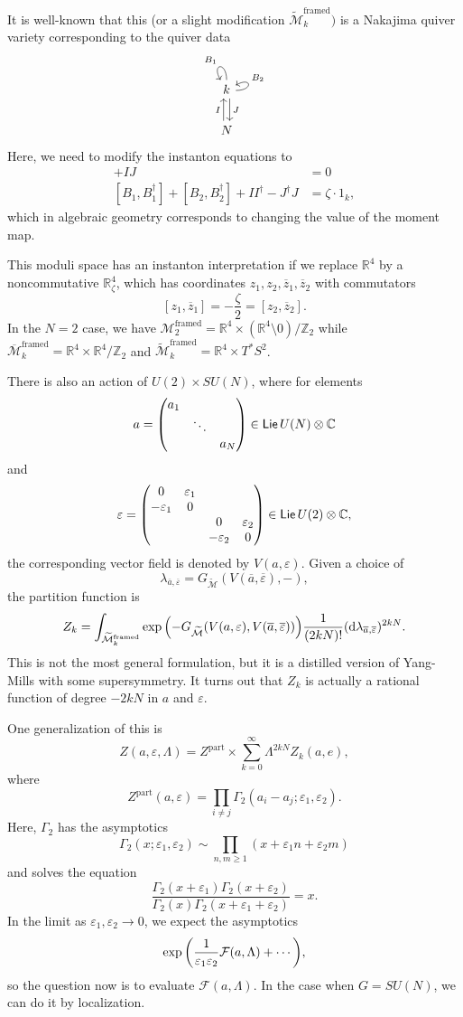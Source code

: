 \documentclass[leqno, openany]{memoir}
\theoremstyle{definition}
\theoremstyle{remark}
\theoremstyle{plain}
\theoremstyle{definition}
\theoremstyle{remark}
\newcommand{\R}{\mathbb{R}}
\newcommand{\C}{\mathbb{C}}
\newcommand{\Z}{\mathbb{Z}}
\newcommand{\ep}{\varepsilon}
\newcommand{\mc}[1]{\mathcal{#1}}
\newcommand{\mr}[1]{\mathrm{#1}}
\newcommand{\ms}[1]{\mathsf{#1}}
\newcommand{\on}[1]{\operatorname{#1}}
\newcommand{\ol}[1]{\overline{#1}}
\newcommand{\wt}[1]{\widetilde{#1}}
\begin{document}
It is well-known that this (or a slight modification $\wt{\mc{M}}_k^{\mr{framed}})$ is a Nakajima quiver variety corresponding to the quiver data
\begin{equation*}
\begin{tikzcd}
    k \ar[shift left=1]{d}{J} \arrow[out=0,in=30,loop,swap,"B_2"] \arrow[out=90,in=120,loop,swap,"B_1"]\\
    N \ar[shift left=1]{u}{I}
\end{tikzcd}
\end{equation*}
Here, we need to modify the instanton equations to
\begin{align*}
    [B_1, B_2] + IJ &= 0 \\
    [B_1, B_1^{\dag}] + [B_2, B_2^{\dag}] + I I^{\dag} - J^{\dag} J &= \zeta \cdot 1_k,
\end{align*}
which in algebraic geometry corresponds to changing the value of the moment map.

This moduli space has an instanton interpretation if we replace $\R^4$ by a noncommutative $\R^4_{\zeta}$, which has coordinates $z_1, z_2, \ol{z}_1, \ol{z}_2$ with commutators
\[ [z_1, \ol{z}_1] = -\frac{\zeta}{2} = [z_2, \ol{z}_2]. \]
In the $N=2$ case, we have $\mc{M}_2^{\mr{framed}} = \R^4 \times (\R^4 \setminus 0)/\Z_2$ while $\ol{\mc{M}}_k^{\mr{framed}} = \R^4 \times \R^4/\Z_2$ and $\wt{\mc{M}}_k^{\mr{framed}} = \R^4 \times T^* S^2$.

There is also an action of $U(2) \times SU(N)$, where for elements
\[ a = \mqty(\dmat{a_1,\ddots,a_N}) \in \on{\ms{Lie}} U(N) \otimes \C \]
and
\[\ep = \mqty(0 & \ep_1 \\ -\ep_1 & 0 \\ & & 0 & \ep_2 \\ & & -\ep_2 & 0) \in \on{\ms{Lie}} U(2) \otimes \C, \]
the corresponding vector field is denoted by $V(a,\ep)$. Given a choice of
\[ \lambda_{\ol{a}, \ol{\ep}} = G_{\wt{\mc{M}}}(V(\ol{a}, \ol{\ep}), -), \]
the partition function is
\[ Z_k = \int_{\wt{\mc{M}}_k^{\mr{framed}}} \exp \qty(-G_{\wt{\mc{M}}}(V(a,\ep), V(\ol{a}, \ol{\ep}))) \frac{1}{(2kN)!} (\dd \lambda_{\ol{a}, \ol{\ep}})^{2kN}. \]
This is not the most general formulation, but it is a distilled version of Yang-Mills with some supersymmetry. It turns out that $Z_k$ is actually a rational function of degree $-2kN$ in $a$ and $\ep$.

One generalization of this is
\[ Z(a,\ep,\Lambda) = Z^{\mr{part}} \times \sum_{k=0}^{\infty} \Lambda^{2kN} Z_k(a,e), \]
where
\[ Z^{\mr{part}}(a,\ep) = \prod_{i \neq j} \Gamma_2(a_i-a_j; \ep_1, \ep_2). \]
Here, $\Gamma_2$ has the asymptotics
\[ \Gamma_2(x; \ep_1, \ep_2) \sim \prod_{n,m \geq 1}(x+\ep_1 n + \ep_2 m) \]
and solves the equation
\[ \frac{\Gamma_2(x+\ep_1) \Gamma_2(x+\ep_2)}{\Gamma_2(x) \Gamma_2(x+\ep_1+\ep_2)} = x. \]
In the limit as $\ep_1, \ep_2 \to 0$, we expect the asymptotics
\[ \exp\qty(\frac{1}{\ep_1 \ep_2} \mc{F}(a,\Lambda) + \cdots), \]
so the question now is to evaluate $\mc{F}(a, \Lambda)$. In the case when $G = SU(N)$, we can do it by localization.
\end{document}

